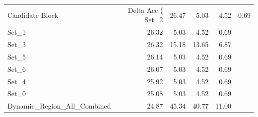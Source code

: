 \begin{tabular}{lrrrr}
\toprule
Candidate Block & Delta Acc (%
\midrule
Set_2 & 26.47 & 5.03 & 4.52 & 0.69 \\
Set_1 & 26.32 & 5.03 & 4.52 & 0.69 \\
Set_3 & 26.32 & 15.18 & 13.65 & 6.87 \\
Set_5 & 26.14 & 5.03 & 4.52 & 0.69 \\
Set_6 & 26.07 & 5.03 & 4.52 & 0.69 \\
Set_4 & 25.92 & 5.03 & 4.52 & 0.69 \\
Set_0 & 25.08 & 5.03 & 4.52 & 0.69 \\
Dynamic_Region_All_Combined & 24.87 & 45.34 & 40.77 & 11.00 \\
\bottomrule
\end{tabular}

